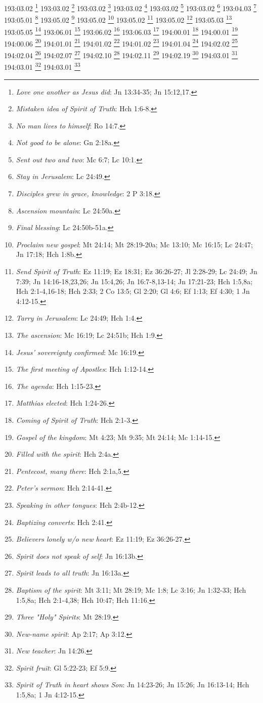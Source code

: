 193:03.02 \footnote{\textit{Love one another as Jesus did}: Jn 13:34-35; Jn 15:12,17.}
193:03.02 \footnote{\textit{Mistaken idea of Spirit of Truth}: Hch 1:6-8.}
193:03.02 \footnote{\textit{No man lives to himself}: Ro 14:7.}
193:03.02 \footnote{\textit{Not good to be alone}: Gn 2:18a.}
193:03.02 \footnote{\textit{Sent out two and two}: Mc 6:7; Lc 10:1.}
193:03.02 \footnote{\textit{Stay in Jerusalem}: Lc 24:49.}
193:04.03 \footnote{\textit{Disciples grew in grace, knowledge}: 2 P 3:18.}
193:05.01 \footnote{\textit{Ascension mountain}: Lc 24:50a.}
193:05.02 \footnote{\textit{Final blessing}: Lc 24:50b-51a.}
193:05.02 \footnote{\textit{Proclaim new gospel}: Mt 24:14; Mt 28:19-20a; Mc 13:10; Mc 16:15; Lc 24:47; Jn 17:18; Hch 1:8b.}
193:05.02 \footnote{\textit{Send Spirit of Truth}: Ez 11:19; Ez 18:31; Ez 36:26-27; Jl 2:28-29; Lc 24:49; Jn 7:39; Jn 14:16-18,23,26; Jn 15:4,26; Jn 16:7-8,13-14; Jn 17:21-23; Hch 1:5,8a; Hch 2:1-4,16-18; Hch 2:33; 2 Co 13:5; Gl 2:20; Gl 4:6; Ef 1:13; Ef 4:30; 1 Jn 4:12-15.}
193:05.02 \footnote{\textit{Tarry in Jerusalem}: Lc 24:49; Hch 1:4.}
193:05.03 \footnote{\textit{The ascension}: Mc 16:19; Lc 24:51b; Hch 1:9.}
193:05.05 \footnote{\textit{Jesus' sovereignty confirmed}: Mc 16:19.}
193:06.01 \footnote{\textit{The first meeting of Apostles}: Hch 1:12-14.}
193:06.02 \footnote{\textit{The agenda}: Hch 1:15-23.}
193:06.03 \footnote{\textit{Matthias elected}: Hch 1:24-26.}
194:00.01 \footnote{\textit{Coming of Spirit of Truth}: Hch 2:1-3.}
194:00.01 \footnote{\textit{Gospel of the kingdom}: Mt 4:23; Mt 9:35; Mt 24:14; Mc 1:14-15.}
194:00.06 \footnote{\textit{Filled with the spirit}: Hch 2:4a.}
194:01.01 \footnote{\textit{Pentecost, many there}: Hch 2:1a,5.}
194:01.02 \footnote{\textit{Peter's sermon}: Hch 2:14-41.}
194:01.02 \footnote{\textit{Speaking in other tongues}: Hch 2:4b-12.}
194:01.04 \footnote{\textit{Baptizing converts}: Hch 2:41.}
194:02.02 \footnote{\textit{Believers lonely w/o new heart}: Ez 11:19; Ez 36:26-27.}
194:02.04 \footnote{\textit{Spirit does not speak of self}: Jn 16:13b.}
194:02.07 \footnote{\textit{Spirit leads to all truth}: Jn 16:13a.}
194:02.10 \footnote{\textit{Baptism of the spirit}: Mt 3:11; Mt 28:19; Mc 1:8; Lc 3:16; Jn 1:32-33; Hch 1:5,8a; Hch 2:1-4,38; Hch 10:47; Hch 11:16.}
194:02.11 \footnote{\textit{Three "Holy" Spirits}: Mt 28:19.}
194:02.19 \footnote{\textit{New-name spirit}: Ap 2:17; Ap 3:12.}
194:03.01 \footnote{\textit{New teacher}: Jn 14:26.}
194:03.01 \footnote{\textit{Spirit fruit}: Gl 5:22-23; Ef 5:9.}
194:03.01 \footnote{\textit{Spirit of Truth in heart shows Son}: Jn 14:23-26; Jn 15:26; Jn 16:13-14; Hch 1:5,8a; 1 Jn 4:12-15.}
